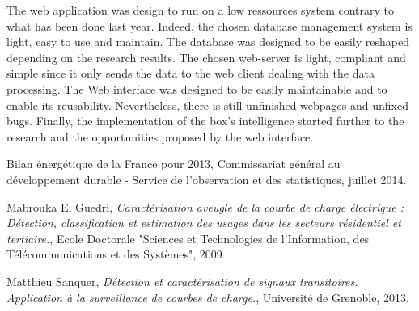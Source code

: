 The web application was design to run on a low ressources system contrary to what has been done last year. Indeed, the chosen database management system is light, easy to use and maintain. The database was designed to be easily reshaped depending on the research results. The chosen web-server is light, compliant and simple since it only sends the data to the web client dealing with the data processing. The Web interface was designed to be easily maintainable and to enable its reusability. Nevertheless, there is still unfinished webpages and unfixed bugs. Finally, the implementation of the box's intelligence started further to the research and the opportunities proposed by the web interface.



\begin{thebibliography}{10}
 Bilan \'energ\'etique de la France pour 2013, Commissariat g\'en\'eral au d\'eveloppement durable - Service de l'observation et des statistiques, juillet 2014.
 
    Mabrouka El Guedri, \emph{Caract\'erisation aveugle de la courbe de charge \'electrique : D\'etection, classification et estimation des usages dans les secteurs r\'esidentiel et tertiaire.}, Ecole Doctorale "Sciences et Technologies de l'Information, des T\'el\'ecommunications et des Syst\`emes", 2009.
 
    Matthieu Sanquer, \textit{D\'etection et caract\'erisation de signaux transitoires. Application \`a la surveillance de courbes de charge.}, Universit\'e de Grenoble, 2013.
\end{thebibliography}